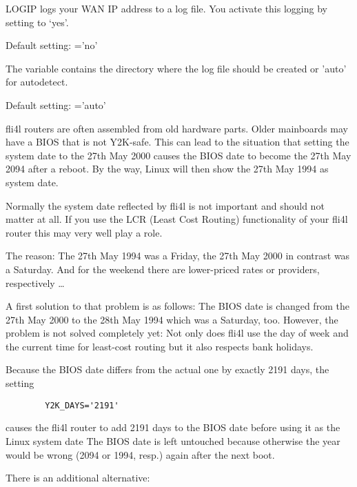   LOGIP logs your WAN IP address to a log file. You activate this logging by
  setting  to `yes'.

  Default setting: ='no'

\begin{description}

  The variable  contains the directory where the log
  file should be created or 'auto' for autodetect.

  Default setting: ='auto'
\end{description}


  fli4l routers are often assembled from old hardware parts. Older
  mainboards may have a BIOS that is not Y2K-safe. This can lead to the
  situation that setting the system date to the 27th May 2000 causes the
  BIOS date to become the 27th May 2094 after a reboot. By the way, Linux 
  will then show the 27th May 1994 as system date.

  Normally the system date reflected by fli4l is not important and should
  not matter at all. If you use the LCR (Least Cost Routing) functionality
  of your fli4l router this may very well play a role.

  The reason: The 27th May 1994 was a Friday, the 27th May 2000 in contrast was
  a Saturday. And for the weekend there are lower-priced rates or providers,
  respectively \ldots

  A first solution to that problem is as follows: The BIOS date is changed
  from the 27th May 2000 to the 28th May 1994 which was a Saturday, too.
  However, the problem is not solved completely yet: Not only does fli4l
  use the day of week and the current time for least-cost routing but it also
  respects bank holidays.

\begin{description}

  Because the BIOS date differs from the actual one by exactly 2191 days, the
  setting

\begin{example}
\begin{verbatim}
        Y2K_DAYS='2191'
\end{verbatim}
\end{example}

  causes the fli4l router to add 2191 days to the BIOS date before using it
  as the Linux system date The BIOS date is left untouched because
  otherwise the year would be wrong (2094 or 1994, resp.) again after the next
  boot.
\end{description}
  There is an additional alternative:

